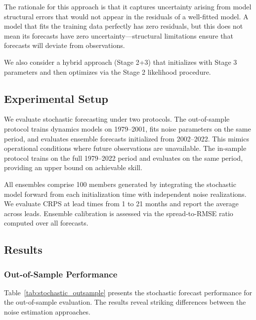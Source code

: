 The rationale for this approach is that it captures uncertainty arising from model structural errors that would not appear in the residuals of a well-fitted model. A model that fits the training data perfectly has zero residuals, but this does not mean its forecasts have zero uncertainty---structural limitations ensure that forecasts will deviate from observations.

We also consider a hybrid approach (Stage 2+3) that initializes with Stage 3 parameters and then optimizes via the Stage 2 likelihood procedure.

\subsection{Experimental Setup}

We evaluate stochastic forecasting under two protocols. The out-of-sample protocol trains dynamics models on 1979--2001, fits noise parameters on the same period, and evaluates ensemble forecasts initialized from 2002--2022. This mimics operational conditions where future observations are unavailable. The in-sample protocol trains on the full 1979--2022 period and evaluates on the same period, providing an upper bound on achievable skill.

All ensembles comprise 100 members generated by integrating the stochastic model forward from each initialization time with independent noise realizations. We evaluate CRPS at lead times from 1 to 21 months and report the average across leads. Ensemble calibration is assessed via the spread-to-RMSE ratio computed over all forecasts.

\subsection{Results}

\subsubsection{Out-of-Sample Performance}

Table~\ref{tab:stochastic_outsample} presents the stochastic forecast performance for the out-of-sample evaluation. The results reveal striking differences between the noise estimation approaches.

